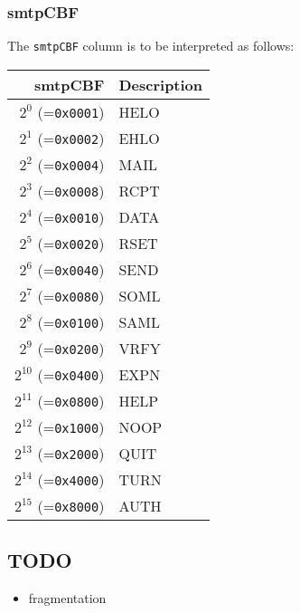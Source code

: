 \documentclass[documentation]{subfiles}
\begin{document}
\subsubsection{smtpCBF}\label{smtpCBF}
The {\tt smtpCBF} column is to be interpreted as follows:
\begin{longtable}{rl}
    \toprule
    {\bf smtpCBF} & {\bf Description} \\
    \midrule\endhead%
    $2^{0}$  (={\tt 0x0001}) & HELO\\
    $2^{1}$  (={\tt 0x0002}) & EHLO\\
    $2^{2}$  (={\tt 0x0004}) & MAIL\\
    $2^{3}$  (={\tt 0x0008}) & RCPT\\
    $2^{4}$  (={\tt 0x0010}) & DATA\\
    $2^{5}$  (={\tt 0x0020}) & RSET\\
    $2^{6}$  (={\tt 0x0040}) & SEND\\
    $2^{7}$  (={\tt 0x0080}) & SOML\\
    $2^{8}$  (={\tt 0x0100}) & SAML\\
    $2^{9}$  (={\tt 0x0200}) & VRFY\\
    $2^{10}$ (={\tt 0x0400}) & EXPN\\
    $2^{11}$ (={\tt 0x0800}) & HELP\\
    $2^{12}$ (={\tt 0x1000}) & NOOP\\
    $2^{13}$ (={\tt 0x2000}) & QUIT\\
    $2^{14}$ (={\tt 0x4000}) & TURN\\
    $2^{15}$ (={\tt 0x8000}) & AUTH\\
    \bottomrule
\end{longtable}

\subsection{TODO}
\begin{itemize}
    \item fragmentation
\end{itemize}
\end{document}
